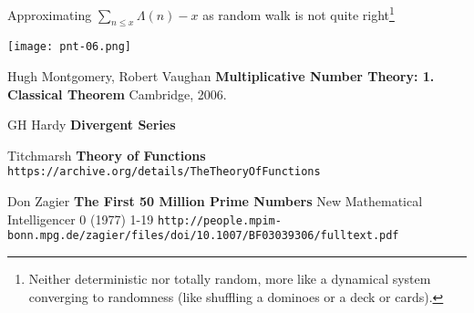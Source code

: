 \documentclass[12pt]{article}
\begin{document}
\newpage

\noindent Approximating $\sum_{n \leq x} \Lambda(n) - x$ as random walk is not quite right\footnote{Neither deterministic nor totally random, more like a dynamical system converging to randomness (like shuffling a dominoes or a deck or cards).}

\texttt{[image: pnt-06.png]}


\newpage

\selectfont \fontsize{12}{10}\selectfont

\begin{thebibliography}{}

\item Hugh Montgomery, Robert Vaughan \textbf{Multiplicative Number Theory: 1.  Classical Theorem} Cambridge, 2006.

\item GH Hardy \textbf{Divergent Series}

\item Titchmarsh \textbf{Theory of Functions} \texttt{https://archive.org/details/TheTheoryOfFunctions}

\item Don Zagier \textbf{The First 50 Million Prime Numbers} New Mathematical Intelligencer 0 (1977) 1-19  \newline\texttt{http://people.mpim-bonn.mpg.de/zagier/files/doi/10.1007/BF03039306/fulltext.pdf}



\end{thebibliography}
\end{document}
